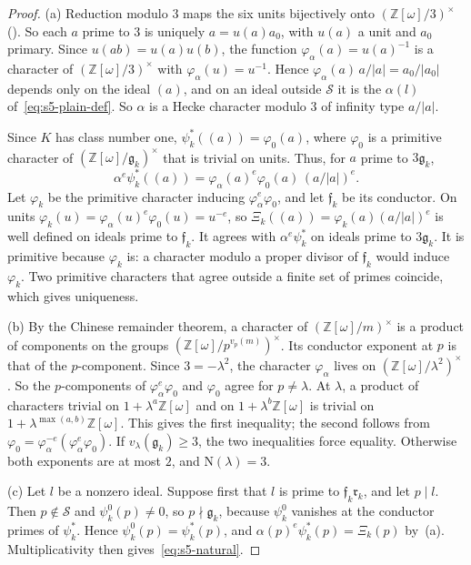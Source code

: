 \documentclass[11pt]{article}
\numberwithin{equation}{section}
\newcommand{\OO}{\mathbb Z[\omega]}
\newcommand{\N}{\mathrm N}
\begin{document}
\begin{proof}
(a) Reduction modulo $3$ maps the six units bijectively onto $(\OO/3)^\times$ (\cite[Section~4.1]{OAI78}). So each $a$ prime
to $3$ is uniquely $a=u(a)a_0$, with $u(a)$ a unit and $a_0$ primary. Since $u(ab)=u(a)u(b)$, the function
$\varphi_\alpha(a)=u(a)^{-1}$ is a character of $(\OO/3)^\times$ with $\varphi_\alpha(u)=u^{-1}$. Hence
$\varphi_\alpha(a)\,a/|a|=a_0/|a_0|$ depends only on the ideal $(a)$, and on an ideal outside $\mathcal S$
it is the $\alpha(l)$ of~\eqref{eq:s5-plain-def}. So $\alpha$ is a Hecke character modulo $3$ of infinity
type $a/|a|$.

Since $K$ has class number one, $\psi_k^*((a))=\varphi_0(a)$, where $\varphi_0$ is a primitive character of
$(\OO/\mathfrak g_k)^\times$ that is trivial on units. Thus, for $a$ prime to $3\mathfrak g_k$,
\begin{equation}\label{eq:d175}
 \alpha^e\psi_k^*((a))=\varphi_\alpha(a)^e\varphi_0(a)\,(a/|a|)^e .
\end{equation}
Let $\varphi_k$ be the primitive character inducing $\varphi_\alpha^e\varphi_0$, and let $\mathfrak f_k$ be
its conductor. On units $\varphi_k(u)=\varphi_\alpha(u)^e\varphi_0(u)=u^{-e}$, so
$\Xi_k((a))=\varphi_k(a)(a/|a|)^e$ is well defined on ideals prime to $\mathfrak f_k$. It agrees with
$\alpha^e\psi_k^*$ on ideals prime to $3\mathfrak g_k$. It is primitive because $\varphi_k$ is: a
character modulo a proper divisor of $\mathfrak f_k$ would induce~$\varphi_k$. Two primitive characters
that agree outside a finite set of primes coincide, which gives uniqueness.

(b) By the Chinese remainder theorem, a character of $(\OO/m)^\times$ is a product of components on the
groups $(\OO/p^{v_p(m)})^\times$. Its conductor exponent at $p$ is that of the $p$-component. Since
$3=-\lambda^2$, the character $\varphi_\alpha$ lives on $(\OO/\lambda^2)^\times$. So the
$p$-components of $\varphi_\alpha^e\varphi_0$ and $\varphi_0$ agree for $p\ne\lambda$. At $\lambda$, a
product of characters trivial on $1+\lambda^a\OO$ and on $1+\lambda^b\OO$ is trivial on
$1+\lambda^{\max(a,b)}\OO$. This gives the first inequality; the second follows from
$\varphi_0=\varphi_\alpha^{-e}(\varphi_\alpha^e\varphi_0)$. If $v_\lambda(\mathfrak g_k)\ge3$, the two
inequalities force equality. Otherwise both exponents are at most $2$, and $\N(\lambda)=3$.

(c) Let $l$ be a nonzero ideal. Suppose first that $l$ is prime to $\mathfrak f_k\mathfrak r_k$, and let
$p\mid l$. Then $p\notin\mathcal S$ and $\psi_k^0(p)\ne0$, so $p\nmid\mathfrak g_k$, because
$\psi_k^0$ vanishes at the conductor primes of $\psi_k^*$. Hence $\psi_k^0(p)=\psi_k^*(p)$, and
$\alpha(p)^e\psi_k^*(p)=\Xi_k(p)$ by~(a). Multiplicativity then gives~\eqref{eq:s5-natural}.


\end{proof}
\end{document}
